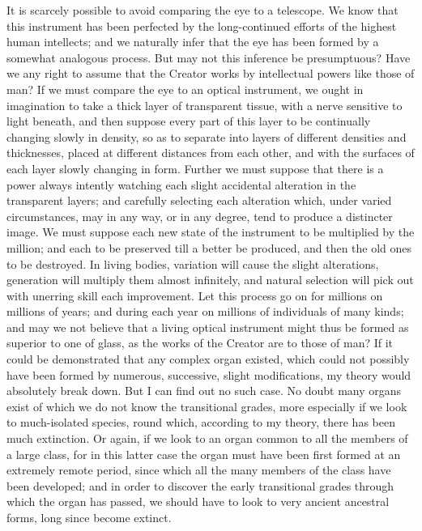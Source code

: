 It is scarcely possible to avoid comparing the eye to a telescope. We know that this instrument has been perfected by the long-continued efforts of the highest human intellects; and we naturally infer that the eye has been formed by a somewhat analogous process. But may not this inference be presumptuous? Have we any right to assume that the Creator works by intellectual powers like those of man? If we must compare the eye to an optical instrument, we ought in imagination to take a thick layer of transparent tissue, with a nerve sensitive to light beneath, and then suppose every part of this layer to be continually changing slowly in density, so as to separate into layers of different densities and thicknesses, placed at different distances from each other, and with the surfaces of each layer slowly changing in form. Further we must suppose that there is a power always intently watching each slight accidental alteration in the transparent layers; and carefully selecting each alteration which, under varied circumstances, may in any way, or in any degree, tend to produce a distincter image. We must suppose each new state of the instrument to be multiplied by the million; and each to be preserved till a better be produced, and then the old ones to be destroyed. In living bodies, variation will cause the slight alterations, generation will multiply them almost infinitely, and natural selection will pick out with unerring skill each improvement. Let this process go on for millions on millions of years; and during each year on millions of individuals of many kinds; and may we not believe that a living optical instrument might thus be formed as superior to one of glass, as the works of the Creator are to those of man?
If it could be demonstrated that any complex organ existed, which could not possibly have been formed by numerous, successive, slight modifications, my theory would absolutely break down. But I can find out no such case. No doubt many organs exist of which we do not know the transitional grades, more especially if we look to much-isolated species, round which, according to my theory, there has been much extinction. Or again, if we look to an organ common to all the members of a large class, for in this latter case the organ must have been first formed at an extremely remote period, since which all the many members of the class have been developed; and in order to discover the early transitional grades through which the organ has passed, we should have to look to very ancient ancestral forms, long since become extinct.
